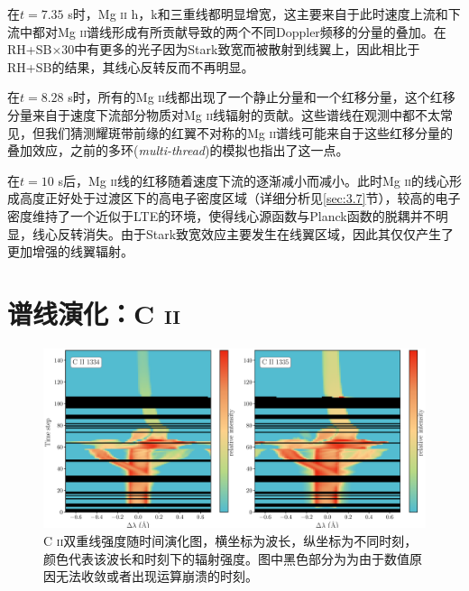 在$t=7.35$ s时，Mg \textsc{ii} h，k和三重线都明显增宽，这主要来自于此时速度上流和下流中都对Mg \textsc{ii}谱线形成有所贡献导致的两个不同Doppler频移的分量的叠加。在RH+SB$\times30$中有更多的光子因为Stark致宽而被散射到线翼上，因此相比于RH+SB的结果，其线心反转反而不再明显。

在$t=8.28$ s时，所有的Mg \textsc{ii}线都出现了一个静止分量和一个红移分量，这个红移分量来自于速度下流部分物质对Mg \textsc{ii}线辐射的贡献。这些谱线在观测中都不太常见，但我们猜测耀斑带前缘的红翼不对称的Mg \textsc{ii}谱线可能来自于这些红移分量的叠加效应，之前\textcites{Rubio2016}的多环(\textit{multi-thread})的模拟也指出了这一点。

在$t=10$ s后，Mg \textsc{ii}线的红移随着速度下流的逐渐减小而减小。此时Mg \textsc{ii}的线心形成高度正好处于过渡区下的高电子密度区域（详细分析见\ref{sec:3.7}节），较高的电子密度维持了一个近似于LTE的环境，使得线心源函数与Planck函数的脱耦并不明显，线心反转消失。由于Stark致宽效应主要发生在线翼区域，因此其仅仅产生了更加增强的线翼辐射。

\section{谱线演化：C \textsc{ii}}

\begin{figure}
	\centering
	\includegraphics[width=\textwidth]{figs/5F11_spectra_imshow_C}
	\caption{C \textsc{ii}双重线强度随时间演化图，横坐标为波长，纵坐标为不同时刻，颜色代表该波长和时刻下的辐射强度。图中黑色部分为为由于数值原因无法收敛或者出现运算崩溃的时刻。}
	\label{fig:3.5}
\end{figure}

